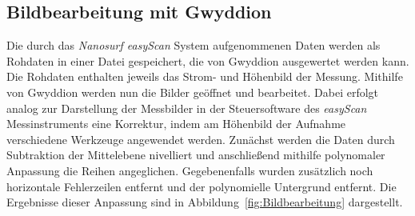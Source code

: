 \documentclass[a4paper,twoside,final]{article}
\begin{document}
\subsection{Bildbearbeitung mit Gwyddion}
Die durch das \textit{Nanosurf easyScan} System aufgenommenen Daten werden als Rohdaten in einer Datei gespeichert, die von Gwyddion ausgewertet werden kann. Die Rohdaten enthalten jeweils das Strom- und Höhenbild der Messung. Mithilfe von Gwyddion werden nun die Bilder geöffnet und bearbeitet. Dabei erfolgt analog zur Darstellung der Messbilder in der Steuersoftware des \textit{easyScan} Messinstruments eine Korrektur, indem am Höhenbild der Aufnahme verschiedene Werkzeuge angewendet werden. Zunächst werden die Daten durch Subtraktion der Mittelebene nivelliert und anschließend mithilfe polynomaler Anpassung die Reihen angeglichen. Gegebenenfalls wurden zusätzlich noch horizontale Fehlerzeilen entfernt und der polynomielle Untergrund entfernt. Die Ergebnisse dieser Anpassung sind in Abbildung~\ref{fig:Bildbearbeitung} dargestellt.
\end{document}
